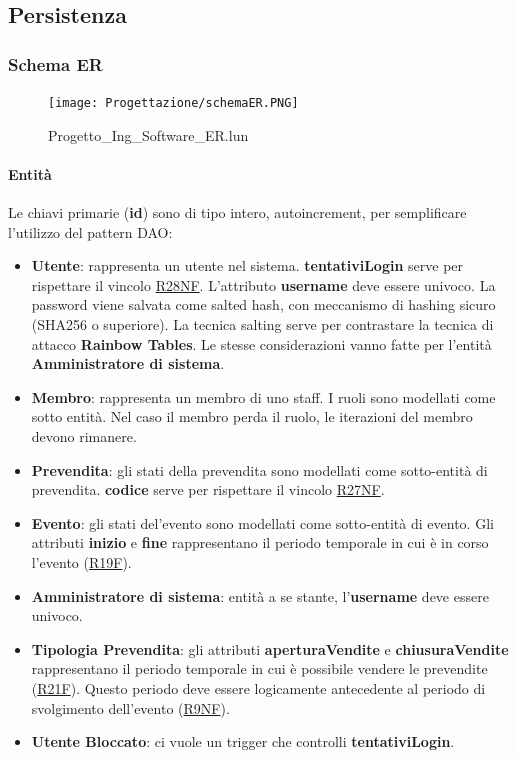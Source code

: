 \documentclass[a4paper]{article}
\begin{document}
\newpage

\subsection{Persistenza}

\subsubsection{Schema ER}

\begin{figure}[H]
    \texttt{[image: Progettazione/schemaER.PNG]}
    \centering
    \caption{Progetto\_Ing\_Software\_ER.lun}
\end{figure}

\paragraph{Entità} Le chiavi primarie (\textbf{id}) sono di tipo intero, autoincrement, per semplificare l'utilizzo del pattern DAO:

\begin{itemize}
    \item \textbf{Utente}: rappresenta un utente nel sistema. \textbf{tentativiLogin} serve per rispettare il vincolo \hyperlink{R28NF}{R28NF}. L'attributo \textbf{username} deve essere univoco. La password viene salvata come salted hash, con meccanismo di hashing sicuro (SHA256 o superiore). La tecnica salting serve per contrastare la tecnica di attacco \textbf{Rainbow Tables}. Le stesse considerazioni vanno fatte per l'entità \textbf{Amministratore di sistema}.
    \item \textbf{Membro}: rappresenta un membro di uno staff. I ruoli sono modellati come sotto entità. Nel caso il membro perda il ruolo, le iterazioni del membro devono rimanere.
    \item \textbf{Prevendita}: gli stati della prevendita sono modellati come sotto-entità di prevendita. \textbf{codice} serve per rispettare il vincolo \hyperlink{R27NF}{R27NF}.
    \item \textbf{Evento}: gli stati del'evento sono modellati come sotto-entità di evento. Gli attributi \textbf{inizio} e \textbf{fine} rappresentano il periodo temporale in cui è in corso l'evento (\hyperlink{R19F}{R19F}).
    \item \textbf{Amministratore di sistema}: entità a se stante, l'\textbf{username} deve essere univoco.
    \item \textbf{Tipologia Prevendita}: gli attributi \textbf{aperturaVendite} e \textbf{chiusuraVendite} rappresentano il periodo temporale in cui è possibile vendere le prevendite (\hyperlink{R21F}{R21F}). Questo periodo deve essere logicamente antecedente al periodo di svolgimento dell'evento (\hyperlink{R9NF}{R9NF}).
    \item \textbf{Utente Bloccato}: ci vuole un trigger che controlli \textbf{tentativiLogin}.
\end{itemize}
\end{document}
